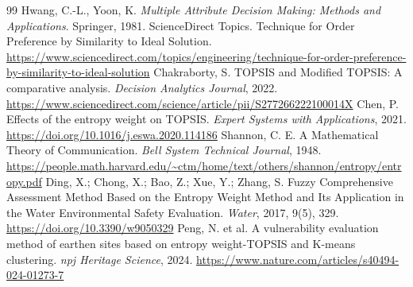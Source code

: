\documentclass[UTF8,a4paper,12pt,fontset=none]{ctexart}
\begin{document}
\begingroup\raggedright
\begin{thebibliography}{99}
 Hwang, C.-L., Yoon, K. \textit{Multiple Attribute Decision Making: Methods and Applications}. Springer, 1981.
 ScienceDirect Topics. Technique for Order Preference by Similarity to Ideal Solution. \url{https://www.sciencedirect.com/topics/engineering/technique-for-order-preference-by-similarity-to-ideal-solution}
 Chakraborty, S. TOPSIS and Modified TOPSIS: A comparative analysis. \textit{Decision Analytics Journal}, 2022. \url{https://www.sciencedirect.com/science/article/pii/S277266222100014X}
 Chen, P. Effects of the entropy weight on TOPSIS. \textit{Expert Systems with Applications}, 2021. \url{https://doi.org/10.1016/j.eswa.2020.114186}
 Shannon, C. E. A Mathematical Theory of Communication. \textit{Bell System Technical Journal}, 1948. \url{https://people.math.harvard.edu/~ctm/home/text/others/shannon/entropy/entropy.pdf}
 Ding, X.; Chong, X.; Bao, Z.; Xue, Y.; Zhang, S. Fuzzy Comprehensive Assessment Method Based on the Entropy Weight Method and Its Application in the Water Environmental Safety Evaluation. \textit{Water}, 2017, 9(5), 329. \url{https://doi.org/10.3390/w9050329}
 Peng, N. et al. A vulnerability evaluation method of earthen sites based on entropy weight-TOPSIS and K-means clustering. \textit{npj Heritage Science}, 2024. \url{https://www.nature.com/articles/s40494-024-01273-7}
\end{thebibliography}
\endgroup
\end{document}
